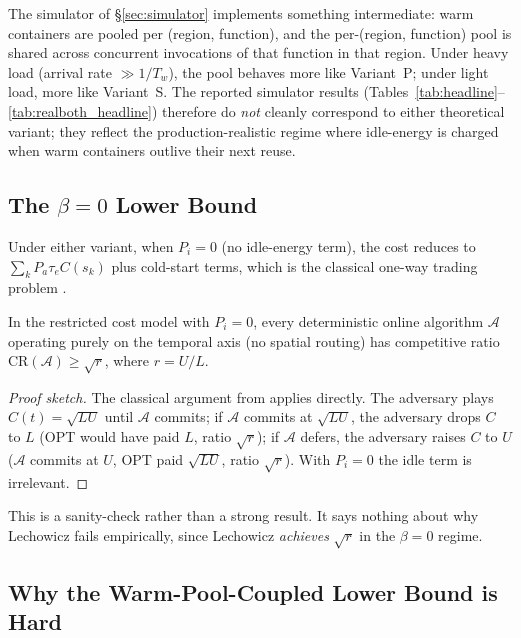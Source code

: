 The simulator of \S\ref{sec:simulator} implements something
intermediate: warm containers are pooled per (region, function), and
the per-(region, function) pool is shared across concurrent
invocations of that function in that region. Under heavy load
(arrival rate $\gg 1/T_w$), the pool behaves more like Variant~P;
under light load, more like Variant~S. The reported simulator results
(Tables~\ref{tab:headline}--\ref{tab:realboth_headline}) therefore
do \emph{not} cleanly correspond to either theoretical variant; they
reflect the production-realistic regime where idle-energy is charged
when warm containers outlive their next reuse.

\subsection{The $\beta = 0$ Lower Bound}
\label{sec:theory:beta0}

Under either variant, when $P_i = 0$ (no idle-energy term), the cost
reduces to $\sum_k P_a \tau_e C(s_k)$ plus cold-start terms, which is
the classical one-way trading problem
\citep{el-yaniv2001,lechowicz2024online}.

\begin{theorem}
\label{thm:online-lower-bound}
In the restricted cost model with $P_i = 0$, every deterministic
online algorithm $\mathcal{A}$ operating purely on the temporal axis
(no spatial routing) has competitive ratio
$\mathrm{CR}(\mathcal{A}) \ge \sqrt{r}$, where $r = U/L$.
\end{theorem}

\begin{proof}[Proof sketch]
The classical argument from \citet{el-yaniv2001} applies directly.
The adversary plays $C(t) = \sqrt{LU}$ until $\mathcal{A}$ commits;
if $\mathcal{A}$ commits at $\sqrt{LU}$, the adversary drops $C$ to
$L$ (OPT would have paid $L$, ratio $\sqrt{r}$); if $\mathcal{A}$
defers, the adversary raises $C$ to $U$ ($\mathcal{A}$ commits at
$U$, OPT paid $\sqrt{LU}$, ratio $\sqrt{r}$). With $P_i = 0$ the
idle term is irrelevant.
\end{proof}

This is a sanity-check rather than a strong result. It says nothing
about why Lechowicz fails empirically, since Lechowicz \emph{achieves}
$\sqrt{r}$ in the $\beta = 0$ regime.

\subsection{Why the Warm-Pool-Coupled Lower Bound is Hard}
\label{sec:theory:why_hard}

